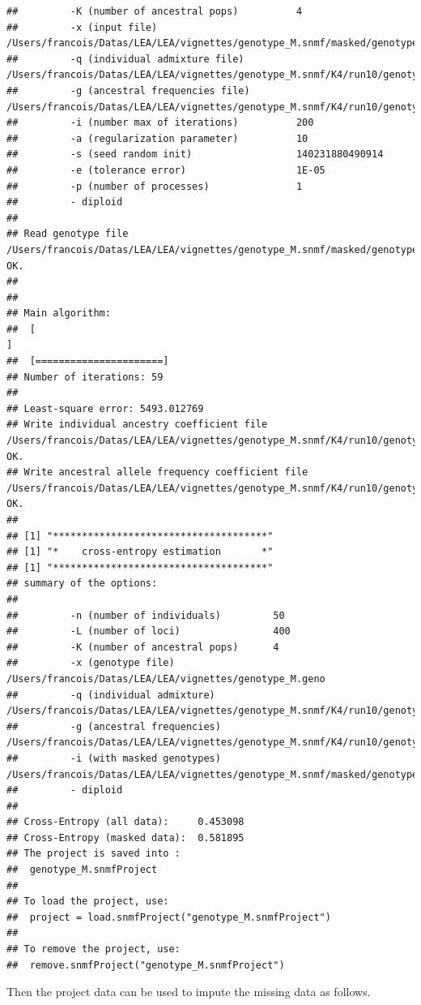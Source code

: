 \documentclass[12pt,a4paper,oneside]{article}\usepackage[]{graphicx}\usepackage[]{color}
\makeatletter
\newenvironment{kframe}{%
 \def\at@end@of@kframe{}%
 \ifinner\ifhmode%
  \def\at@end@of@kframe{\end{minipage}}%
  \begin{minipage}{\columnwidth}%
 \fi\fi%
 \def\FrameCommand##1{\hskip\@totalleftmargin \hskip-\fboxsep
 \colorbox{shadecolor}{##1}\hskip-\fboxsep
     \hskip-\linewidth \hskip-\@totalleftmargin \hskip\columnwidth}%
 \MakeFramed {\advance\hsize-\width
   \@totalleftmargin\z@ \linewidth\hsize
   \@setminipage}}%
 {\par\unskip\endMakeFramed%
 \at@end@of@kframe}
\newenvironment{knitrout}{}{} %
\makeatother
\begin{document}
\begin{knitrout}
\begin{kframe}
\begin{verbatim}
##         -K (number of ancestral pops)          4
##         -x (input file)                        /Users/francois/Datas/LEA/LEA/vignettes/genotype_M.snmf/masked/genotype_M_I.geno
##         -q (individual admixture file)         /Users/francois/Datas/LEA/LEA/vignettes/genotype_M.snmf/K4/run10/genotype_M_r10.4.Q
##         -g (ancestral frequencies file)        /Users/francois/Datas/LEA/LEA/vignettes/genotype_M.snmf/K4/run10/genotype_M_r10.4.G
##         -i (number max of iterations)          200
##         -a (regularization parameter)          10
##         -s (seed random init)                  140231880490914
##         -e (tolerance error)                   1E-05
##         -p (number of processes)               1
##         - diploid
## 
## Read genotype file /Users/francois/Datas/LEA/LEA/vignettes/genotype_M.snmf/masked/genotype_M_I.geno:		OK.
## 
## 
## Main algorithm:
## 	[                                                                           ]
## 	[======================]
## Number of iterations: 59
## 
## Least-square error: 5493.012769
## Write individual ancestry coefficient file /Users/francois/Datas/LEA/LEA/vignettes/genotype_M.snmf/K4/run10/genotype_M_r10.4.Q:		OK.
## Write ancestral allele frequency coefficient file /Users/francois/Datas/LEA/LEA/vignettes/genotype_M.snmf/K4/run10/genotype_M_r10.4.G:	OK.
## 
## [1] "*************************************"
## [1] "*    cross-entropy estimation       *"
## [1] "*************************************"
## summary of the options:
## 
##         -n (number of individuals)         50
##         -L (number of loci)                400
##         -K (number of ancestral pops)      4
##         -x (genotype file)                 /Users/francois/Datas/LEA/LEA/vignettes/genotype_M.geno
##         -q (individual admixture)          /Users/francois/Datas/LEA/LEA/vignettes/genotype_M.snmf/K4/run10/genotype_M_r10.4.Q
##         -g (ancestral frequencies)         /Users/francois/Datas/LEA/LEA/vignettes/genotype_M.snmf/K4/run10/genotype_M_r10.4.G
##         -i (with masked genotypes)         /Users/francois/Datas/LEA/LEA/vignettes/genotype_M.snmf/masked/genotype_M_I.geno
##         - diploid
## 
## Cross-Entropy (all data):	 0.453098
## Cross-Entropy (masked data):	 0.581895
## The project is saved into :
##  genotype_M.snmfProject 
## 
## To load the project, use:
##  project = load.snmfProject("genotype_M.snmfProject")
## 
## To remove the project, use:
##  remove.snmfProject("genotype_M.snmfProject")
\end{verbatim}
\end{kframe}
\end{knitrout}
Then the project data can be used to impute the missing data as follows. 
\end{document}
